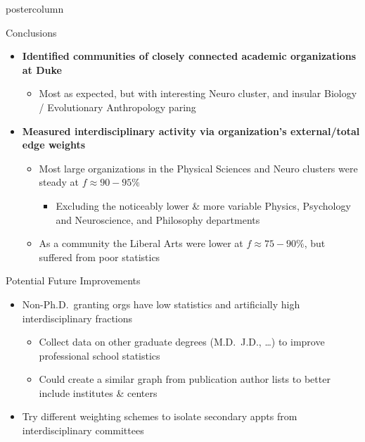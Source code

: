 \documentclass{beamer}
\begin{document}
\begin{frame}
\begin{columns}
\begin{column}{.57\textwidth}
\begin{beamercolorbox}[center]{postercolumn}
\begin{minipage}{.98\textwidth}
{  \begin{myblock}{Conclusions}
    \begin{itemize}
      \item \textbf{Identified communities of closely connected academic organizations at Duke}
      \begin{itemize}
        \item Most as expected, but with interesting Neuro cluster, and insular Biology / Evolutionary Anthropology paring
      \end{itemize}
      \item \textbf{Measured interdisciplinary activity via organization's external/total edge weights }
      \begin{itemize}
        \item Most large organizations in the Physical Sciences and Neuro clusters were steady at $f \approx 90-95\%$
        \begin{itemize}
          \item Excluding the noticeably lower \& more variable Physics, Psychology and Neuroscience, and Philosophy departments
        \end{itemize}
        \item As a community the Liberal Arts were lower at $f \approx 75-90\%$, but suffered from poor statistics
      \end{itemize}
    \end{itemize}
  \end{myblock}\vfill


  \begin{myblock}{Potential Future Improvements}
    \begin{itemize}
      \item Non-Ph.D.\ granting orgs have low statistics and artificially high interdisciplinary fractions
      \begin{itemize}
        \item Collect data on other graduate degrees (M.D.\, J.D., \ldots) to improve professional school statistics
        \item Could create a similar graph from publication author lists to better include institutes \& centers
      \end{itemize}
      \item Try different weighting schemes to isolate secondary appts from interdisciplinary committees
    \end{itemize}
  \end{myblock}\vfill


}
\end{minipage}
\end{beamercolorbox}
\end{column}
\end{columns}
\end{frame}
\end{document}
